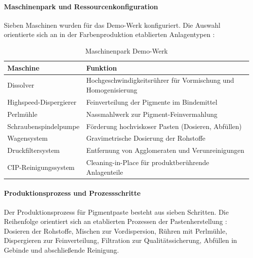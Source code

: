\paragraph{Maschinenpark und Ressourcenkonfiguration}

Sieben Maschinen wurden für das Demo-Werk konfiguriert. Die Auswahl orientierte sich an in der Farbenproduktion etablierten Anlagentypen \citep{vci:lacke_farben2018}:

\begin{table}[h]
\centering
\caption{Maschinenpark Demo-Werk}
\label{tab:Maschinen}
\begin{tabular}{lp{8cm}}
\hline
\textbf{Maschine} & \textbf{Funktion} \\
\hline
Dissolver & Hochgeschwindigkeitsrührer für Vormischung und Homogenisierung \\
Highspeed-Dispergierer & Feinverteilung der Pigmente im Bindemittel \\
Perlmühle & Nassmahlwerk zur Pigment-Feinvermahlung \\
Schraubenspindelpumpe & Förderung hochviskoser Pasten (Dosieren, Abfüllen) \\
Wagensystem & Gravimetrische Dosierung der Rohstoffe \\
Druckfiltersystem & Entfernung von Agglomeraten und Verunreinigungen \\
CIP-Reinigungssystem & Cleaning-in-Place für produktberührende Anlagenteile \\
\hline
\end{tabular}
\end{table}


\paragraph{Produktionsprozess und Prozessschritte}

Der Produktionsprozess für Pigmentpaste besteht aus sieben Schritten. Die Reihenfolge orientiert sich an etablierten Prozessen der Pastenherstellung \citep{goldschmidt:lackproduktion2019}: Dosieren der Rohstoffe, Mischen zur Vordispersion, Rühren mit Perlmühle, Dispergieren zur Feinverteilung, Filtration zur Qualitätssicherung, Abfüllen in Gebinde und abschließende Reinigung.

